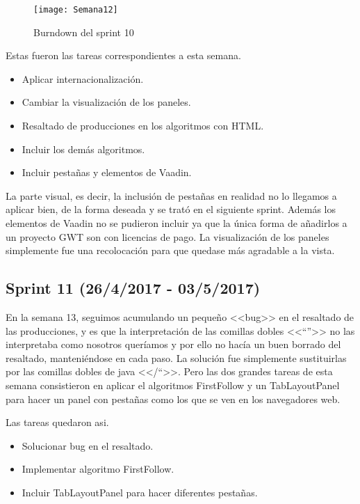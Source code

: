 \begin{figure}[h]
\centering
\texttt{[image: Semana12]}
\caption{Burndown del sprint 10}
\label{fig:A.9}
\end{figure}

Estas fueron las tareas correspondientes a esta semana.

\begin{itemize}
\item Aplicar internacionalización.
\item Cambiar la visualización de los paneles.
\item Resaltado de producciones en los algoritmos con HTML.
\item Incluir los demás algoritmos.
\item Incluir pestañas y elementos de Vaadin.
\end{itemize}

La parte visual, es decir, la inclusión de pestañas en realidad no lo llegamos a aplicar bien, de la forma deseada y se trató en el siguiente sprint. Además los elementos de Vaadin no se pudieron incluir ya que la única forma de añadirlos a un proyecto GWT son con licencias de pago. La visualización de los paneles simplemente fue una recolocación para que quedase más agradable a la vista.


\subsection{Sprint 11 (26/4/2017 - 03/5/2017)}

En la semana 13, seguimos acumulando un pequeño <<bug>> en el resaltado de las producciones, y es que la interpretación de las comillas dobles <<``''>> no las interpretaba como nosotros queríamos y por ello no hacía un buen borrado del resaltado, manteniéndose en cada paso. La solución fue simplemente sustituirlas por las comillas dobles de java <</``>>. Pero las dos grandes tareas de esta semana consistieron en aplicar el algoritmos FirstFollow y un TabLayoutPanel para hacer un panel con pestañas como los que se ven en los navegadores web.

Las tareas quedaron asi.

\begin{itemize}
\item Solucionar bug en el resaltado.
\item Implementar algoritmo FirstFollow.
\item Incluir TabLayoutPanel para hacer diferentes pestañas.
\end{itemize}

